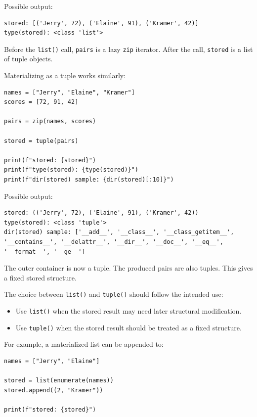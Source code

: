 Possible output:

\begin{verbatim}
stored: [('Jerry', 72), ('Elaine', 91), ('Kramer', 42)]
type(stored): <class 'list'>
\end{verbatim}

Before the \texttt{list()} call, \texttt{pairs} is a lazy \texttt{zip} iterator. After the call, \texttt{stored} is a list of tuple objects.

Materializing as a tuple works similarly:

\begin{verbatim}
names = ["Jerry", "Elaine", "Kramer"]
scores = [72, 91, 42]

pairs = zip(names, scores)

stored = tuple(pairs)

print(f"stored: {stored}")
print(f"type(stored): {type(stored)}")
print(f"dir(stored) sample: {dir(stored)[:10]}")
\end{verbatim}

Possible output:

\begin{verbatim}
stored: (('Jerry', 72), ('Elaine', 91), ('Kramer', 42))
type(stored): <class 'tuple'>
dir(stored) sample: ['__add__', '__class__', '__class_getitem__',
'__contains__', '__delattr__', '__dir__', '__doc__', '__eq__',
'__format__', '__ge__']
\end{verbatim}

The outer container is now a tuple. The produced pairs are also tuples. This gives a fixed stored structure.

The choice between \texttt{list()} and \texttt{tuple()} should follow the intended use:

\begin{itemize}
    \item Use \texttt{list()} when the stored result may need later structural modification.
    \item Use \texttt{tuple()} when the stored result should be treated as a fixed structure.
\end{itemize}

For example, a materialized list can be appended to:

\begin{verbatim}
names = ["Jerry", "Elaine"]

stored = list(enumerate(names))
stored.append((2, "Kramer"))

print(f"stored: {stored}")
\end{verbatim}

